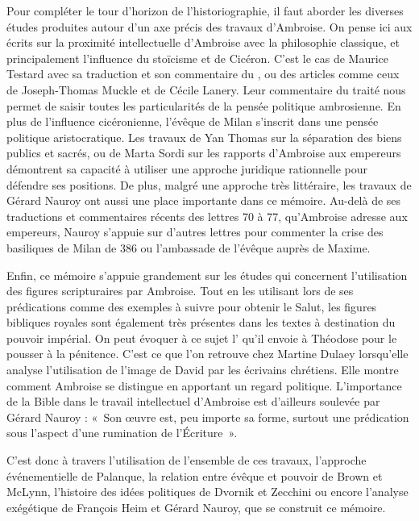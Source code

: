 Pour compléter le tour d'horizon de l'historiographie, il faut aborder les diverses études produites autour d'un axe précis des travaux d'Ambroise. On pense ici aux écrits sur la proximité intellectuelle d'Ambroise avec la philosophie classique, et principalement l'influence du stoïcisme et de Cicéron. C'est le cas de Maurice Testard avec sa traduction et son commentaire du , ou des articles comme ceux de Joseph-Thomas Muckle\autocite{muckle_officiis} et de Cécile Lanery\autocite{lanery_magistere}. Leur commentaire du traité nous permet de saisir toutes les particularités de la pensée politique ambrosienne. En plus de l'influence cicéronienne, l'évêque de Milan s'inscrit dans une pensée politique aristocratique. Les travaux de Yan Thomas sur la séparation des biens publics et sacrés\autocite{thomas_valeur_2002}, ou de Marta Sordi sur les rapports d'Ambroise aux empereurs\autocite{sordi_concezione_1988} démontrent sa capacité à utiliser une approche juridique rationnelle pour défendre ses positions. De plus, malgré une approche très littéraire, les travaux de Gérard Nauroy ont aussi une place importante dans ce mémoire. Au-delà de ses traductions et commentaires récents des lettres 70 à 77, qu'Ambroise adresse aux empereurs\autocite{ambroise_lettres}, Nauroy s'appuie sur d'autres lettres pour commenter la crise des basiliques de Milan de 386 ou l'ambassade de l'évêque auprès de Maxime.

\bigskip

Enfin, ce mémoire s'appuie grandement sur les études qui concernent l'utilisation des figures scripturaires par Ambroise. Tout en les utilisant lors de ses prédications comme des exemples à suivre pour obtenir le Salut, les figures bibliques royales sont également très présentes dans les textes à destination du pouvoir impérial. On peut évoquer à ce sujet l' qu'il envoie à Théodose pour le pousser à la pénitence. C'est ce que l'on retrouve chez Martine Dulaey lorsqu'elle analyse l'utilisation de l'image de David par les écrivains chrétiens\autocite{dulaey_david_3}. Elle montre comment Ambroise se distingue en apportant un regard politique. L'importance de la Bible dans le travail intellectuel d'Ambroise est d'ailleurs soulevée par Gérard Nauroy : «~Son œuvre est, peu importe sa forme, surtout une prédication sous l'aspect d'une rumination de l'Écriture~»\autocite{nauroy_ecriture}.

\bigskip

C'est donc à travers l'utilisation de l'ensemble de ces travaux, l'approche événementielle de Palanque, la relation entre évêque et pouvoir de Brown et McLynn, l'histoire des idées politiques de Dvornik et Zecchini ou encore l'analyse exégétique de François Heim et Gérard Nauroy, que se construit ce mémoire.

